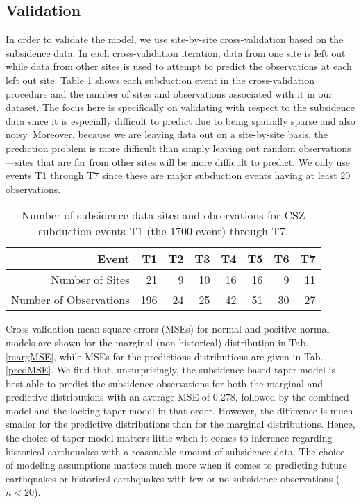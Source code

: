 {\subsection{Validation}
\label{validation}
In order to validate the model, we use site-by-site cross-validation based on the subsidence data.  In each cross-validation iteration, data from one site is left out while data from other sites is used to attempt to predict the observations at each left out site.  Table \ref{nObsCV} shows each subduction event in the cross-validation procedure and the number of sites and observations associated with it in our dataset.  The focus here is specifically on validating with respect to the subsidence data since it is especially difficult to predict due to being spatially sparse and also noisy.  Moreover, because we are leaving data out on a site-by-site basis, the prediction problem is more difficult than simply leaving out random observations---sites that are far from other sites will be more difficult to predict.  We only use events T1 through T7 since these are major subduction events having at least 20 observations.

\begin{table}[ht]
\centering
\begin{tabular}{r|rrrrrrr}
  \hline
 Event & T1 & T2 & T3 & T4 & T5 & T6 & T7 \\ 
  \hline
Number of Sites &  21 &   9 &  10 &  16 &  16 &   9 &  11 \\ 
Number of Observations & 196 &  24 &  25 &  42 &  51 &  30 &  27 \\ 
   \hline
\end{tabular}
\caption{Number of subsidence data sites and observations for CSZ subduction events T1 (the 1700 event) through T7.}
\label{nObsCV}
\end{table}

Cross-validation mean square errors (MSEs) for normal and positive normal models are shown for the marginal (non-historical) distribution in Tab. \ref{margMSE}, while MSEs for the predictions distributions are given in Tab. \ref{predMSE}.  We find that, unsurprisingly, the subsidence-based taper model is best able to predict the subsidence observations for both the marginal and predictive distributions with an average MSE of 0.278, followed by the combined model and the locking taper model in that order.  However, the difference is much smaller for the predictive distributions than for the marginal distributions.  Hence, the choice of taper model matters little when it comes to inference regarding historical earthquakes with a reasonable amount of subsidence data.  The choice of modeling assumptions matters much more when it comes to predicting future earthquakes or historical earthquakes with few or no subsidence observations ($n < 20$).

}
